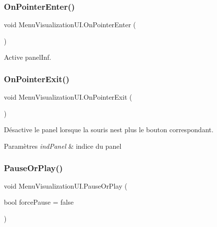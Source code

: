 \subsubsection{\texorpdfstring{On\+Pointer\+Enter()}{OnPointerEnter()}}
{\footnotesize\ttfamily void Menu\+Visualization\+U\+I.\+On\+Pointer\+Enter (\begin{DoxyParamCaption}{ }\end{DoxyParamCaption})\hspace{0.3cm}{\ttfamily [inline]}}



Active panel\+Inf. 

\mbox{\label{class_menu_visualization_u_i_a6ebf2452335526b9d63b69ce420d2365}} 
\subsubsection{\texorpdfstring{On\+Pointer\+Exit()}{OnPointerExit()}}
{\footnotesize\ttfamily void Menu\+Visualization\+U\+I.\+On\+Pointer\+Exit (\begin{DoxyParamCaption}{ }\end{DoxyParamCaption})\hspace{0.3cm}{\ttfamily [inline]}}



Désactive le panel lorsque la souris n\textquotesingle{}est plus le bouton correspondant. 


\begin{DoxyParams}{Paramètres}
{\em ind\+Panel} & indice du panel\\
\hline
\end{DoxyParams}
\mbox{\label{class_menu_visualization_u_i_a9affc75173b7b9e70340b2b934398464}} 
\subsubsection{\texorpdfstring{Pause\+Or\+Play()}{PauseOrPlay()}}
{\footnotesize\ttfamily void Menu\+Visualization\+U\+I.\+Pause\+Or\+Play (\begin{DoxyParamCaption}\item[{bool}]{force\+Pause = {\ttfamily false} }\end{DoxyParamCaption})\hspace{0.3cm}{\ttfamily [inline]}}



